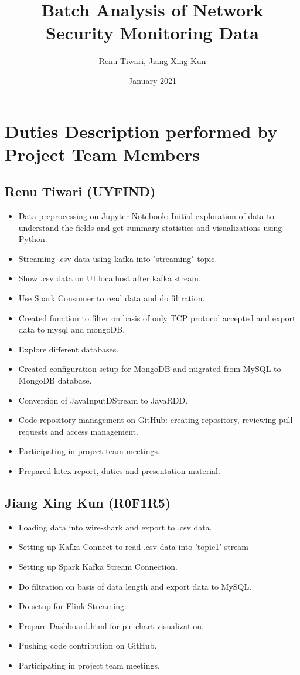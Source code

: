 \documentclass{article}
\title{Batch Analysis of Network Security Monitoring Data}
\author{Renu Tiwari, Jiang Xing Kun}
\date{January 2021}
\begin{document}
\maketitle

\section{Duties Description performed by Project Team Members}

\subsection{Renu Tiwari (UYFIND)}
\begin{itemize}
    \item Data preprocessing on Jupyter Notebook: Initial exploration of  data to understand the fields and get  summary statistics and visualizations using Python.
    \item Streaming .csv data using kafka into "streaming" topic.
     \item Show .csv data on UI localhost after kafka stream.
    \item Use Spark Consumer to read data and do filtration.
    \item Created function to filter on basis of only TCP protocol accepted and export data to mysql and mongoDB.
    \item Explore different databases.
    \item Created configuration setup for MongoDB and migrated from MySQL to MongoDB database.
    \item Conversion of JavaInputDStream to JavaRDD.
    \item Code repository management on GitHub: creating repository, reviewing pull requests and access management.
    \item Participating in project team meetings.
    \item Prepared latex report, duties and  presentation material.
    \end{itemize}

\subsection{Jiang Xing Kun (R0F1R5)}
\begin{itemize}
   \item Loading data into wire-shark and export to .csv data.
    \item Setting up Kafka Connect to read .csv data into 'topic1' stream
    \item Setting up Spark Kafka Stream Connection.
    \item Do filtration on basis of data length and export data to MySQL.
    \item Do setup for Flink Streaming.
    \item Prepare Dashboard.html for pie chart visualization.
    \item Pushing code contribution on GitHub.
     \item Participating in project team meetings, 
\end{itemize}
\end{document}
